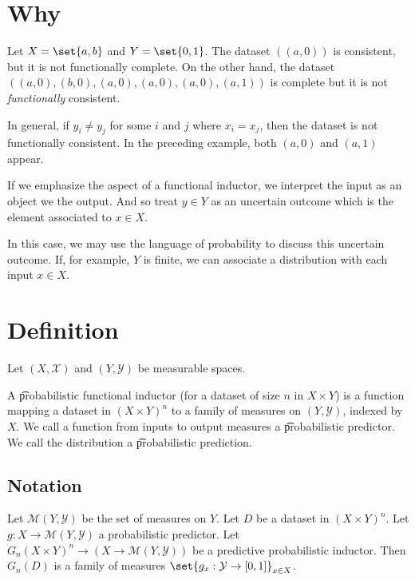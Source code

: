 

\section*{Why}

Let $X = \set{a, b}$ and $Y = \set{0, 1}$.
The dataset $((a, 0))$ is consistent, but it is not functionally complete.
On the other hand, the dataset $((a,0), (b,0), (a,0), (a,0), (a,0), (a, 1))$
is complete but it is not \textit{functionally} consistent.

In general, if $y_i \neq y_j$ for some $i$ and $j$ where $x_i = x_j$, then the dataset is not functionally consistent.
In the preceding example, both $(a, 0)$ and $(a, 1)$ appear.

If we emphasize the  aspect of a functional inductor, we interpret the input as an object we  the output.
And so treat $y \in Y$ as an uncertain outcome which is the element associated to $x \in X$.

In this case, we may use the language of probability to discuss this uncertain outcome.
If, for example, $Y$ is finite, we can associate a distribution with each input $x \in X$.

\section*{Definition}

Let $(X, \mathcal{X} )$ and $(Y, \mathcal{Y} )$ be measurable spaces.

A \t{probabilistic functional inductor} (for a dataset of size $n$ in $X \times Y$) is a function mapping a dataset in $(X \times Y)^n$ to a family of measures on $(Y, \mathcal{Y} )$, indexed by $X$.
We call a function from inputs to output measures a \t{probabilistic predictor}.
We call the distribution a \t{probabilistic prediction}.

\subsection*{Notation}

Let $\mathcal{M} (Y, \mathcal{Y} )$ be the set of measures on $Y$.
Let $D$ be a dataset in $(X \times  Y)^n$.
Let $g: X \to \mathcal{M} (Y, \mathcal{Y} )$ a probabilistic predictor.
Let $G_n (X \times Y)^n \to (X \to \mathcal{M} (Y, \mathcal{Y} ))$ be a predictive probabilistic inductor.
Then $G_n(D)$ is a family of measures $\set{g_x: \mathcal{Y} \to [0, 1]}_{x \in X}$.

\blankpage